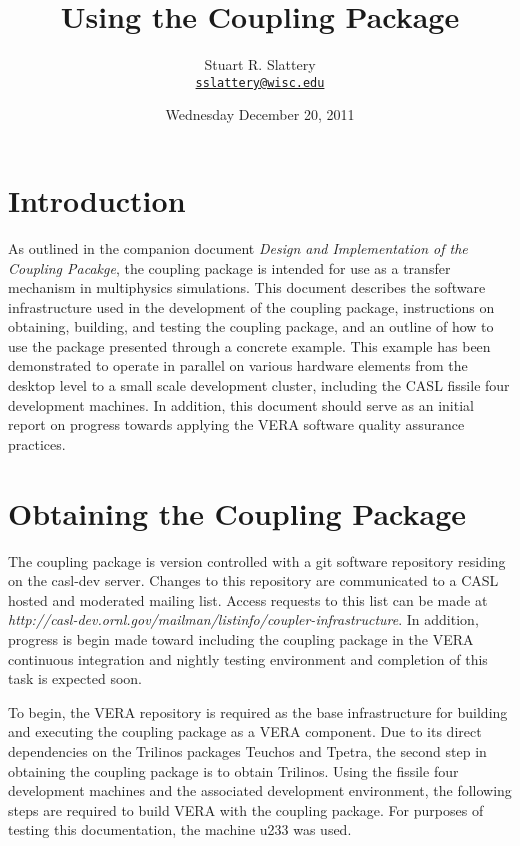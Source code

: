 \documentclass[letterpaper]{article}
\author{Stuart R. Slattery
  \\ \href{mailto:sslattery@wisc.edu}{\texttt{sslattery@wisc.edu}}
}
\date{Wednesday December 20, 2011}
\title{Using the Coupling Package}
\begin{document}
\maketitle

\section{Introduction}
As outlined in the companion document {\sl Design and Implementation of
  the Coupling Pacakge}, the coupling package is intended for use as a
transfer mechanism in multiphysics simulations. This document
describes the software infrastructure used in the development of the
coupling package, instructions on obtaining, building, and testing the
coupling package, and an outline of how to use the package presented
through a concrete example. This example has been demonstrated to
operate in parallel on various hardware elements from the desktop
level to a small scale development cluster, including the CASL fissile
four development machines. In addition, this document should serve as
an initial report on progress towards applying the VERA software quality
assurance practices.

\section{Obtaining the Coupling Package}
The coupling package is version controlled with a git software
repository residing on the casl-dev server. Changes to this repository
are communicated to a CASL hosted and moderated mailing list. Access
requests to this list can be made at
{\sl http://casl-dev.ornl.gov/mailman/listinfo/coupler-infrastructure}. In 
addition, progress is begin made toward including the coupling package
in the VERA continuous integration and nightly testing environment and
completion of this task is expected soon.

To begin, the VERA repository is required as the base infrastructure
for building and executing the coupling package as a VERA
component. Due to its direct dependencies on the Trilinos packages
Teuchos and Tpetra, the second step in obtaining the coupling package
is to obtain Trilinos. Using the fissile four development machines and
the associated development environment, the following steps are
required to build VERA with the coupling package. For purposes of
testing this documentation, the machine u233 was used.
\end{document}
